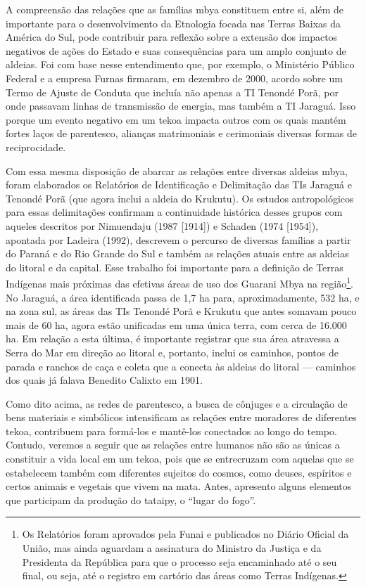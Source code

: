\documentclass{article}
\begin{document}
A compreens\~ao das rela\c{c}\~oes que as fam\'ilias mbya constituem
entre si, al\'em de importante para o desenvolvimento da Etnologia
focada nas Terras Baixas da Am\'erica do Sul, pode contribuir para
reflex\~ao sobre a extens\~ao dos impactos negativos de a\c{c}\~oes do
Estado e suas consequ\^encias para um amplo conjunto de aldeias. Foi
com base nesse entendimento que, por exemplo, o Minist\'erio P\'ublico
Federal e a empresa Furnas firmaram, em dezembro de 2000, acordo sobre
um Termo de Ajuste de Conduta que inclu\'ia n\~ao apenas a TI Tenond\'e
Por\~a, por onde passavam linhas de transmiss\~ao de energia, mas
tamb\'em a TI Jaragu\'a. Isso porque um evento negativo em um tekoa
impacta outros com os quais mant\'em fortes la\c{c}os de parentesco,
alian\c{c}as matrimoniais e cerimoniais diversas formas de
reciprocidade.

Com essa mesma disposi\c{c}\~ao de abarcar as rela\c{c}\~oes entre
diversas aldeias mbya, foram elaborados os Relat\'orios de
Identifica\c{c}\~ao e Delimita\c{c}\~ao das TIs Jaragu\'a e Tenond\'e
Por\~a (que agora inclui a aldeia do Krukutu). Os estudos
antropol\'ogicos para essas delimita\c{c}\~oes confirmam a continuidade
hist\'orica desses grupos com aqueles descritos por Nimuendaju (1987
[1914]) e Schaden (1974 [1954]), apontada por Ladeira (1992), descrevem
o percurso de diversas fam\'ilias a partir do Paran\'a e do Rio Grande
do Sul e tamb\'em as rela\c{c}\~oes atuais entre as aldeias do litoral
e da capital. Esse trabalho foi importante para a defini\c{c}\~ao de
Terras Ind\'igenas mais pr\'oximas das efetivas \'areas de uso dos
Guarani Mbya na regi\~ao\footnote{ Os Relat\'orios foram aprovados pela
Funai e publicados no Di\'ario Oficial da Uni\~ao, mas ainda aguardam a
assinatura do Ministro da Justi\c{c}a e da Presidenta da Rep\'ublica
para que o processo seja encaminhado at\'e o seu final, ou seja, at\'e
o registro em cart\'orio das \'areas como Terras Ind\'igenas.}. No
Jaragu\'a, a \'area identificada passa de 1,7 ha para, aproximadamente,
532 ha, e na zona sul, as \'areas das TIs Tenond\'e Por\~a e Krukutu
que antes somavam pouco mais de 60 ha, agora est\~ao unificadas em uma
\'unica terra, com cerca de 16.000 ha. Em rela\c{c}\~ao a esta
\'ultima, \'e importante registrar que sua \'area atravessa a Serra do
Mar em dire\c{c}\~ao ao litoral e, portanto, inclui os caminhos, pontos
de parada e ranchos de ca\c{c}a e coleta que a conecta \`as aldeias do
litoral --- caminhos dos quais j\'a falava Benedito Calixto em 1901.

Como dito acima, as redes de parentesco, a busca de c\^onjuges e a
circula\c{c}\~ao de bens materiais e simb\'olicos intensificam as
rela\c{c}\~oes entre moradores de diferentes tekoa, contribuem para
form\'a-los e mant\^e-los conectados ao longo do tempo. Contudo,
veremos a seguir que as rela\c{c}\~oes entre humanos n\~ao s\~ao as
\'unicas a constituir a vida local em um tekoa, pois que se entrecruzam
com aquelas que se estabelecem tamb\'em com diferentes sujeitos do
cosmos, como deuses, esp\'iritos e certos animais e vegetais que vivem
na mata. Antes, apresento alguns elementos que participam da
produ\c{c}\~ao do tataipy, o {\textquotedblleft}lugar do
fogo{\textquotedblright}.
\end{document}
